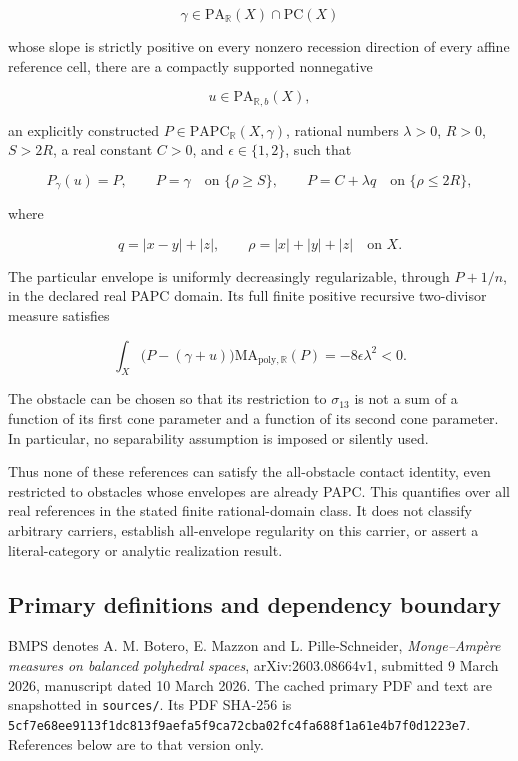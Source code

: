 \documentclass[
  10pt,
]{article}
\begin{document}
\[
\gamma\in\mathrm{PA}_{\mathbb R}(X)\cap\mathrm{PC}(X)
\]

whose slope is strictly positive on every nonzero recession direction of
every affine reference cell, there are a compactly supported nonnegative

\[
u\in\mathrm{PA}_{\mathbb R,b}(X),
\]

an explicitly constructed \(P\in\mathrm{PAPC}_{\mathbb R}(X,\gamma)\),
rational numbers \(\lambda>0\), \(R>0\), \(S>2R\), a real constant
\(C>0\), and \(\epsilon\in\{1,2\}\), such that

\[
P_\gamma(u)=P,\qquad P=\gamma\quad\text{on }\{\rho\geq S\},
\qquad P=C+\lambda q\quad\text{on }\{\rho\leq2R\},
\]

where

\[
q=|x-y|+|z|,\qquad \rho=|x|+|y|+|z|\quad\text{on }X.
\]

The particular envelope is uniformly decreasingly regularizable, through
\(P+1/n\), in the declared real PAPC domain. Its full finite positive
recursive two-divisor measure satisfies

\[
\int_X\bigl(P-(\gamma+u)\bigr)
\mathrm{MA}_{\mathrm{poly},\mathbb R}(P)
=-8\epsilon\lambda^2<0. \tag{T}
\]

The obstacle can be chosen so that its restriction to \(\sigma_{13}\) is
not a sum of a function of its first cone parameter and a function of
its second cone parameter. In particular, no separability assumption is
imposed or silently used.

Thus none of these references can satisfy the all-obstacle contact
identity, even restricted to obstacles whose envelopes are already PAPC.
This quantifies over all real references in the stated finite
rational-domain class. It does not classify arbitrary carriers,
establish all-envelope regularity on this carrier, or assert a
literal-category or analytic realization result.

\subsection{Primary definitions and dependency
boundary}\label{primary-definitions-and-dependency-boundary}

BMPS denotes A. M. Botero, E. Mazzon and L. Pille-Schneider,
\emph{Monge--Ampère measures on balanced polyhedral spaces},
arXiv:2603.08664v1, submitted 9 March 2026, manuscript dated 10 March
2026. The cached primary PDF and text are snapshotted in
\texttt{sources/}. Its PDF SHA-256 is
\texttt{5cf7e68ee9113f1dc813f9aefa5f9ca72cba02fc4fa688f1a61e4b7f0d1223e7}.
References below are to that version only.
\end{document}

